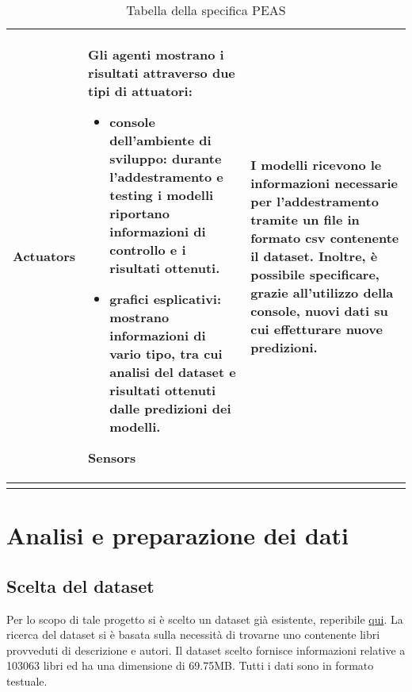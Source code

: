 \documentclass[12pt,oneside]{article}
\begin{document}
\begin{enumerate}
\begin{longtable}{ | p{3cm} | p{11cm} | }
    \hline
    \textbf{Actuators} & Gli agenti mostrano i risultati attraverso due tipi di attuatori: \begin{itemize}
    \item console dell'ambiente di sviluppo: durante l'addestramento e testing i modelli riportano informazioni di controllo e i risultati ottenuti.
    \item grafici esplicativi: mostrano informazioni di vario tipo, tra cui analisi del dataset e risultati ottenuti dalle predizioni dei modelli.\end{itemize}
    \hline
    \textbf{Sensors} & I modelli ricevono le informazioni necessarie per l'addestramento tramite un file in formato csv contenente il dataset. Inoltre, è possibile specificare, grazie all'utilizzo della console, nuovi dati su cui effetturare nuove predizioni. \\
    \hline
    \caption{Tabella della specifica PEAS}
    \end{longtable}
\label{table:ta}
\end{enumerate}

    

\section{Analisi e preparazione dei dati}
    \begin{enumerate}
    \subsection{Scelta del dataset}
    \begin{justify}
    Per lo scopo di tale progetto si è scelto un dataset già esistente, reperibile \href{https://www.kaggle.com/datasets/elvinrustam/books-dataset}{qui}. La ricerca del dataset si è basata sulla necessità di trovarne uno contenente libri provveduti di descrizione e autori. Il dataset scelto fornisce informazioni relative a 103063 libri ed ha una dimensione di 69.75MB. Tutti i dati sono in formato testuale.
    \end{justify}
    \end{enumerate}
\end{document}
